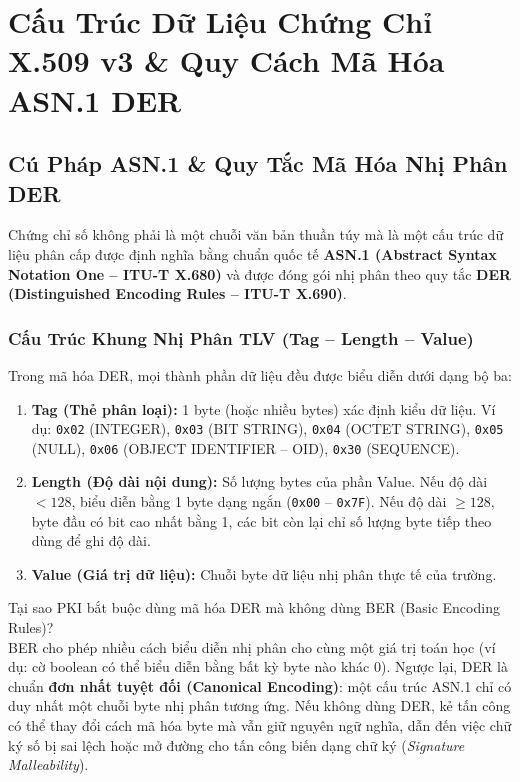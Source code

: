 \chapter{Cấu Trúc Dữ Liệu Chứng Chỉ X.509 v3 \& Quy Cách Mã Hóa ASN.1 DER}


\section{Cú Pháp ASN.1 \& Quy Tắc Mã Hóa Nhị Phân DER}

Chứng chỉ số không phải là một chuỗi văn bản thuần túy mà là một cấu trúc dữ liệu phân cấp được định nghĩa bằng chuẩn quốc tế \textbf{ASN.1 (Abstract Syntax Notation One -- ITU-T X.680)} và được đóng gói nhị phân theo quy tắc \textbf{DER (Distinguished Encoding Rules -- ITU-T X.690)}.

\subsection{Cấu Trúc Khung Nhị Phân TLV (Tag -- Length -- Value)}

Trong mã hóa DER, mọi thành phần dữ liệu đều được biểu diễn dưới dạng bộ ba:
\begin{enumerate}
  \item \textbf{Tag (Thẻ phân loại):} 1 byte (hoặc nhiều bytes) xác định kiểu dữ liệu. Ví dụ: \texttt{0x02} (INTEGER), \texttt{0x03} (BIT STRING), \texttt{0x04} (OCTET STRING), \texttt{0x05} (NULL), \texttt{0x06} (OBJECT IDENTIFIER -- OID), \texttt{0x30} (SEQUENCE).
  \item \textbf{Length (Độ dài nội dung):} Số lượng bytes của phần Value. Nếu độ dài $< 128$, biểu diễn bằng 1 byte dạng ngắn (\texttt{0x00} -- \texttt{0x7F}). Nếu độ dài $\ge 128$, byte đầu có bit cao nhất bằng 1, các bit còn lại chỉ số lượng byte tiếp theo dùng để ghi độ dài.
  \item \textbf{Value (Giá trị dữ liệu):} Chuỗi byte dữ liệu nhị phân thực tế của trường.
\end{enumerate}

\begin{batngo}
Tại sao PKI bắt buộc dùng mã hóa DER mà không dùng BER (Basic Encoding Rules)?\\
BER cho phép nhiều cách biểu diễn nhị phân cho cùng một giá trị toán học (ví dụ: cờ boolean có thể biểu diễn bằng bất kỳ byte nào khác 0). Ngược lại, DER là chuẩn \textbf{đơn nhất tuyệt đối (Canonical Encoding)}: một cấu trúc ASN.1 chỉ có duy nhất một chuỗi byte nhị phân tương ứng. Nếu không dùng DER, kẻ tấn công có thể thay đổi cách mã hóa byte mà vẫn giữ nguyên ngữ nghĩa, dẫn đến việc chữ ký số bị sai lệch hoặc mở đường cho tấn công biến dạng chữ ký (\emph{Signature Malleability}).
\end{batngo}

